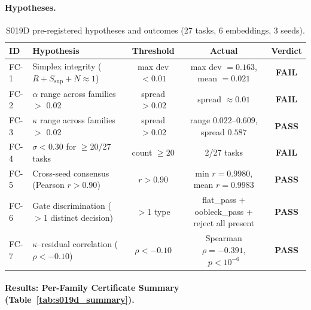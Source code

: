 \documentclass{article}
\begin{document}
\paragraph{Hypotheses.}
\begin{table}[htbp]
\centering
\small
\caption{S019D pre-registered hypotheses and outcomes (27 tasks, 6 embeddings, 3 seeds).}
\label{tab:s019d_hypotheses}
\begin{tabular}{llccc}
\toprule
\textbf{ID} & \textbf{Hypothesis} & \textbf{Threshold} & \textbf{Actual} & \textbf{Verdict} \\
\midrule
FC-1 & Simplex integrity ($R+S_{\text{sup}}+N \approx 1$) & max dev $< 0.01$ & max dev $= 0.163$, mean $= 0.021$ & \textbf{FAIL} \\
FC-2 & $\alpha$ range across families $>$ 0.02 & spread $> 0.02$ & spread $\approx 0.01$ & \textbf{FAIL} \\
FC-3 & $\kappa$ range across families $>$ 0.02 & spread $> 0.02$ & range $0.022$--$0.609$, spread $0.587$ & \textbf{PASS} \\
FC-4 & $\sigma < 0.30$ for $\geq$20/27 tasks & count $\geq 20$ & 2/27 tasks & \textbf{FAIL} \\
FC-5 & Cross-seed consensus (Pearson $r > 0.90$) & $r > 0.90$ & min $r = 0.9980$, mean $r = 0.9983$ & \textbf{PASS} \\
FC-6 & Gate discrimination ($>$1 distinct decision) & $>$1 type & flat\_pass + oobleck\_pass + reject all present & \textbf{PASS} \\
FC-7 & $\kappa$--residual correlation ($\rho < -0.10$) & $\rho < -0.10$ & Spearman $\rho = -0.391$, $p < 10^{-6}$ & \textbf{PASS} \\
\bottomrule
\end{tabular}
\end{table}

\paragraph{Results: Per-Family Certificate Summary (Table~\ref{tab:s019d_summary}).}
\end{document}
